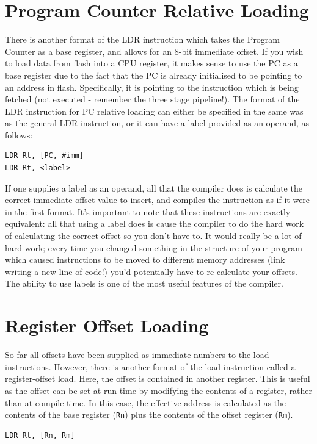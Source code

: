 \section{Program Counter Relative Loading}
There is another format of the LDR instruction which takes the Program Counter as a base register, and allows for an 8-bit immediate offset. If you wish to load data from flash into a CPU register, it makes sense to use the PC as a base register due to the fact that the PC is already initialised to be pointing to an address in flash. Specifically, it is pointing to the instruction which is being fetched (not executed - remember the three stage pipeline!). The format of the LDR instruction for PC relative loading can either be specified in the same was as the general LDR instruction, or it can have a label provided as an operand, as follows:
\begin{lstlisting}[fontadjust=true,frame=trBL]
LDR Rt, [PC, #imm]
LDR Rt, <label>
\end{lstlisting}
If one supplies a label as an operand, all that the compiler does is calculate the correct immediate offset value to insert, and compiles the instruction as if it were in the first format. It's important to note that these instructions are exactly equivalent: all that using a label does is cause the compiler to do the hard work of calculating the correct offset so you don't have to. It would really be a lot of hard work; every time you changed something in the structure of your program which caused instructions to be moved to different memory addresses (link writing a new line of code!) you'd potentially have to re-calculate your offsets. The ability to use labels is one of the most useful features of the compiler.


\section{Register Offset Loading}
So far all offsets have been supplied as immediate numbers to the load instructions. However, there is another format of the load instruction called a register-offset load. Here, the offset is contained in another register. This is useful as the offset can be set at run-time by modifying the contents of a register, rather than at compile time. In this case, the effective address is calculated as the contents of the base register (\texttt{Rn}) plus the contents of the offset register (\texttt{Rm}). 
\begin{lstlisting}[fontadjust=true,frame=trBL]
LDR Rt, [Rn, Rm]
\end{lstlisting}


